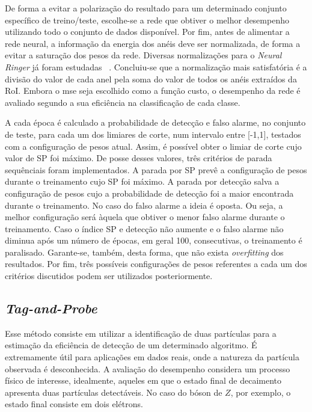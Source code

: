 De forma a evitar a polarização do resultado para um determinado  conjunto específico de treino/teste, escolhe-se a rede que obtiver o melhor desempenho utilizando todo o conjunto de dados disponível.
Por fim, antes de alimentar a rede neural, a informação da energia dos anéis deve ser normalizada, de forma a evitar a saturação dos pesos da rede. Diversas normalizações para o 
\textit{Neural Ringer} já foram estudadas~\cite{tese_torres} . Concluiu-se que a normalização mais satisfatória é a divisão do valor de cada anel pela soma do valor de todos os anéis extraídos da RoI.
Embora o \gls{mse} seja escolhido como a função custo, o desempenho da rede é avaliado segundo a sua eficiência na classificação de cada classe. 

A cada época é calculado a probabilidade de detecção e falso alarme, no conjunto de teste, para cada um dos limiares de corte, num intervalo entre [-1,1], testados com a configuração
de pesos atual. Assim, é possível obter o limiar de corte cujo valor de SP foi máximo. De posse desses valores, três critérios de parada sequênciais foram implementados. A parada
por SP prevê a configuração de pesos durante o treinamento cujo SP foi máximo. A parada por detecção salva a configuração de pesos cujo a probabilidade de detecção foi a maior encontrada
durante o treinamento. No caso do falso alarme a ideia é oposta. Ou seja, a melhor configuração será àquela que obtiver o menor falso alarme durante o treinamento.
Caso o índice SP e detecção não aumente e o falso alarme não diminua após um número de épocas, em geral 100, consecutivas, o treinamento é paralisado. Garante-se, também, desta
forma, que não exista  \textit{overfitting} dos resultados. Por fim, três possíveis configurações de pesos referentes a cada um dos critérios discutidos podem ser utilizados posteriormente.



\subsection{\textit{Tag-and-Probe}}

Esse método consiste em utilizar a identificação de duas partículas para a estimação da eficiência de detecção de um determinado algoritmo. É extremamente útil para aplicações em 
dados reais, onde a natureza da partícula observada é desconhecida. A avaliação do desempenho considera um processo físico de interesse, idealmente, aqueles em que o estado 
final de decaimento apresenta duas partículas detectáveis. No caso do bóson de $Z$, por exemplo, o estado final consiste em dois elétrons.

